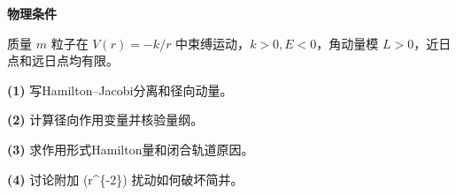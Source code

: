 \textbf{物理条件}\par 质量 \(m\) 粒子在 \(V(r)=-k/r\) 中束缚运动，\(k>0,E<0\)，角动量模 \(L>0\)，近日点和远日点均有限。
\par\noindent\textbf{(1)} 写Hamilton–Jacobi分离和径向动量。
\par\noindent\textbf{(2)} 计算径向作用变量并核验量纲。
\par\noindent\textbf{(3)} 求作用形式Hamilton量和闭合轨道原因。
\par\noindent\textbf{(4)} 讨论附加 (r\textasciicircum{}\{-2\}) 扰动如何破坏简并。
